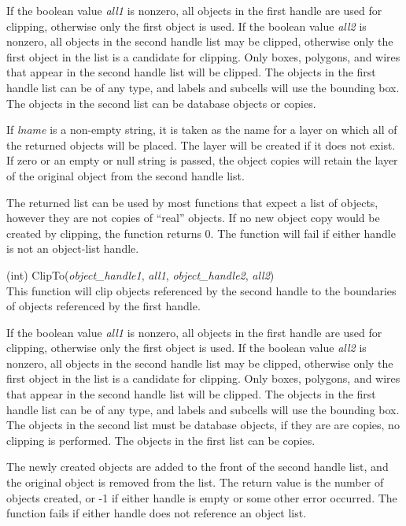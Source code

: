 \begin{description}
If the boolean value {\it all1} is nonzero, all objects in the first
handle are used for clipping, otherwise only the first object is used. 
If the boolean value {\it all2} is nonzero, all objects in the second
handle list may be clipped, otherwise only the first object in the
list is a candidate for clipping.  Only boxes, polygons, and wires
that appear in the second handle list will be clipped.  The objects in
the first handle list can be of any type, and labels and subcells will
use the bounding box.  The objects in the second list can be database
objects or copies.

If {\it lname} is a non-empty string, it is taken as the name for a
layer on which all of the returned objects will be placed.  The layer
will be created if it does not exist.  If zero or an empty or null
string is passed, the object copies will retain the layer of the
original object from the second handle list.

The returned list can be used by most functions that expect a list of
objects, however they are not copies of ``real'' objects.  If no new
object copy would be created by clipping, the function returns 0.  The
function will fail if either handle is not an object-list handle.

\item{(int) \vt ClipTo({\it object\_handle1}, {\it all1\/},
  {\it object\_handle2}, {\it all2\/})}\\
This function will clip objects referenced by the second handle to the
boundaries of objects referenced by the first handle.

If the boolean value {\it all1} is nonzero, all objects in the first
handle are used for clipping, otherwise only the first object is used. 
If the boolean value {\it all2} is nonzero, all objects in the second
handle list may be clipped, otherwise only the first object in the
list is a candidate for clipping.  Only boxes, polygons, and wires
that appear in the second handle list will be clipped.  The objects in
the first handle list can be of any type, and labels and subcells will
use the bounding box.  The objects in the second list must be database
objects, if they are are copies, no clipping is performed.  The
objects in the first list can be copies.

The newly created objects are added to the front of the second handle
list, and the original object is removed from the list.  The return
value is the number of objects created, or -1 if either handle is
empty or some other error occurred.  The function fails if either
handle does not reference an object list.


\end{description}
